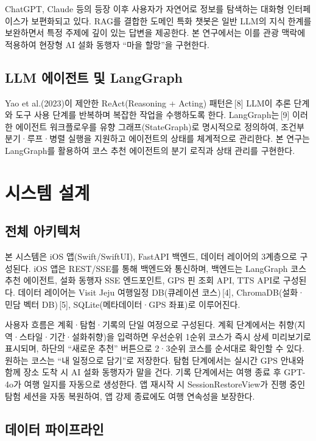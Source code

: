 \documentclass[10pt,twocolumn,a4paper]{article}
\begin{document}
ChatGPT, Claude 등의 등장 이후 사용자가 자연어로 정보를 탐색하는 대화형
인터페이스가 보편화되고 있다. RAG를 결합한 도메인 특화 챗봇은 일반 LLM의
지식 한계를 보완하면서 특정 주제에 깊이 있는 답변을 제공한다. 본 연구에서는
이를 관광 맥락에 적용하여 현장형 AI 설화 동행자 ``마을 할망''을 구현한다.

\subsection{LLM 에이전트 및 LangGraph}

Yao et al.(2023)이 제안한 ReAct(Reasoning + Acting) 패턴은\,[8] LLM이 추론
단계와 도구 사용 단계를 반복하며 복잡한 작업을 수행하도록 한다. LangGraph는\,[9]
이러한 에이전트 워크플로우를 유향 그래프(StateGraph)로 명시적으로 정의하여,
조건부 분기·루프·병렬 실행을 지원하고 에이전트의 상태를 체계적으로 관리한다.
본 연구는 LangGraph를 활용하여 코스 추천 에이전트의 분기 로직과 상태 관리를
구현한다.

\section{시스템 설계}

\subsection{전체 아키텍처}

본 시스템은 iOS 앱(Swift/SwiftUI), FastAPI 백엔드, 데이터 레이어의 3계층으로
구성된다. iOS 앱은 REST/SSE를 통해 백엔드와 통신하며, 백엔드는 LangGraph
코스 추천 에이전트, 설화 동행자 SSE 엔드포인트, GPS 핀 조회 API, TTS API로
구성된다. 데이터 레이어는 Visit Jeju 여행일정 DB(큐레이션 코스)\,[4],
ChromaDB(설화·민담 벡터 DB)\,[5], SQLite(메타데이터·GPS 좌표)로
이루어진다.

사용자 흐름은 계획·탐험·기록의 단일 여정으로 구성된다. 계획 단계에서는
취향(지역·스타일·기간·설화취향)을 입력하면 우선순위 1순위 코스가 즉시
상세 미리보기로 표시되며, 하단의 ``새로운 추천'' 버튼으로 2·3순위 코스를
순서대로 확인할 수 있다. 원하는 코스는 ``내 일정으로 담기''로 저장한다.
탐험 단계에서는
실시간 GPS 안내와 함께 장소 도착 시 AI 설화 동행자가 말을 건다.
기록 단계에서는 여행 종료 후 GPT-4o가 여행 일지를 자동으로 생성한다.
앱 재시작 시 SessionRestoreView가 진행 중인 탐험 세션을 자동 복원하여,
앱 강제 종료에도 여행 연속성을 보장한다.

\subsection{데이터 파이프라인}
\end{document}
